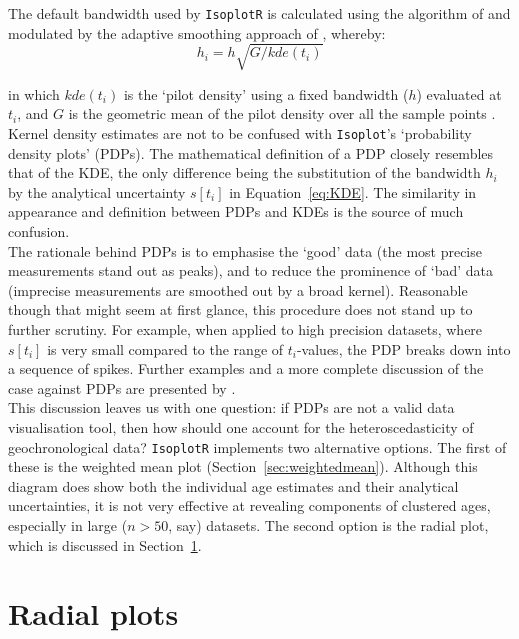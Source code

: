 \begin{refsection}
The default bandwidth used by \texttt{IsoplotR} is calculated using
the algorithm of \citet{botev2010} and modulated by the adaptive
smoothing approach of \citet{abramson1982}, whereby:
\[
  h_i = h \sqrt{G/kde(t_i)}
  \label{eq:Abramson}
\]

\noindent in which $kde(t_i)$ is the `pilot density' using a fixed
bandwidth ($h$) evaluated at $t_i$, and $G$ is the geometric mean of
the pilot density over all the sample points \citep{kerm2003}.\\

Kernel density estimates are not to be confused with
\texttt{Isoplot}'s `probability density plots' (PDPs). The
mathematical definition of a PDP closely resembles that of the KDE,
the only difference being the substitution of the bandwidth $h_i$ by
the analytical uncertainty $s[t_i]$ in Equation~\ref{eq:KDE}. The
similarity in appearance and definition between PDPs and KDEs is the
source of much confusion.\\

The rationale behind PDPs is to emphasise the `good' data (the most
precise measurements stand out as peaks), and to reduce the prominence
of `bad' data (imprecise measurements are smoothed out by a broad
kernel). Reasonable though that might seem at first glance, this
procedure does not stand up to further scrutiny. For example, when
applied to high precision datasets, where $s[t_i]$ is very small
compared to the range of $t_i$-values, the PDP breaks down into a
sequence of spikes. Further examples and a more complete discussion of
the case against PDPs are presented by \citet{vermeesch2012b,
  vermeesch2018b}.\\

This discussion leaves us with one question: if PDPs are not a valid
data visualisation tool, then how should one account for the
heteroscedasticity of geochronological data?  \texttt{IsoplotR}
implements two alternative options. The first of these is the weighted
mean plot (Section~\ref{sec:weightedmean}).  Although this diagram
does show both the individual age estimates and their analytical
uncertainties, it is not very effective at revealing components of
clustered ages, especially in large ($n>50$, say) datasets. The second
option is the radial plot, which is discussed in
Section~\ref{sec:radial}.\\

\section{Radial plots}
\label{sec:radial}


\end{refsection}
